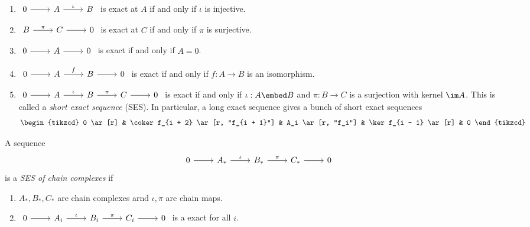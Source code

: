 \documentclass[a4paper]{article}
\begin{document}
\begin{eg}\leavevmode
  \begin{enumerate}
  \item \(
    \begin{tikzcd}
      0 \ar[r] & A \ar[r, "\iota"] & B 
    \end{tikzcd}
  \) is exact at \(A\) if and only if \(\iota\) is injective.

\item \(
    \begin{tikzcd}
      B \ar[r, "\pi"] & C \ar[r] & 0
    \end{tikzcd}
  \) is exact at \(C\) if and only if \(\pi\) is surjective.
\item \(
  \begin{tikzcd}
    0 \ar[r] & A \ar[r] & 0
  \end{tikzcd}
  \) is exact if and only if \(A = 0\).
\item \(
  \begin{tikzcd}
    0 \ar[r] & A \ar[r, "f"] & B \ar[r] & 0
  \end{tikzcd}
  \) is exact if and only if \(f: A \to B\) is an isomorphism.
\item \(
  \begin{tikzcd}
    0 \ar[r] & A \ar[r, "\iota"] & B \ar[r, "\pi"] & C \ar[r] & 0
  \end{tikzcd}
  \) is exact if and only if \(\iota: A \embed B \) and \(\pi: B \to C\) is a surjection with kernel \(\im A\). This is called a \emph{short exact sequence} (SES). In particular, a long exact sequence gives a bunch of short exact sequences
  \[
    \begin{tikzcd}
      0 \ar[r] & \coker f_{i + 2} \ar[r, "f_{i + 1}"] & A_i \ar[r, "f_i"] & \ker f_{i - 1} \ar[r] & 0
    \end{tikzcd}
  \]
  \end{enumerate}
\end{eg}

\begin{definition}
  A sequence
  \[
    \begin{tikzcd}
      0 \ar[r] & A_* \ar[r, "\iota"] & B_* \ar[r, "\pi"] & C_* \ar[r] & 0
    \end{tikzcd}
  \]
  is a \emph{SES of chain complexes} if
  \begin{enumerate}
  \item \(A_*, B_*, C_*\) are chain complexes arnd \(\iota, \pi\) are chain maps.
  \item \(
    \begin{tikzcd}
      0 \ar[r] & A_i \ar[r, "\iota"] & B_i \ar[r, "\pi"] & C_i \ar[r] & 0
    \end{tikzcd}
    \) is a exact for all \(i\).
  \end{enumerate}
\end{definition}
\end{document}
